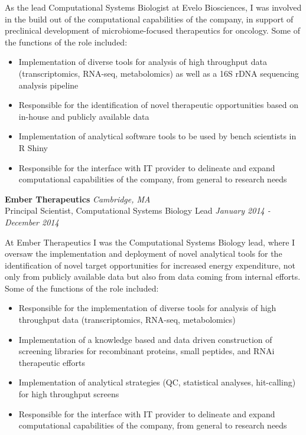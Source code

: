\documentclass[11pt, a4paper]{awesome-cv}
\providecommand{\tightlist}{%
	\setlength{\itemsep}{0pt}\setlength{\parskip}{0pt}}
\begin{document}
As the lead Computational Systems Biologist at Evelo Biosciences, I was
involved in the build out of the computational capabilities of the
company, in support of preclinical development of microbiome-focused
therapeutics for oncology. Some of the functions of the role included:

\begin{itemize}
\tightlist
\item
  Implementation of diverse tools for analysis of high throughput data
  (transcriptomics, RNA-seq, metabolomics) as well as a 16S rDNA
  sequencing analysis pipeline
\item
  Responsible for the identification of novel therapeutic opportunities
  based on in-house and publicly available data
\item
  Implementation of analytical software tools to be used by bench
  scientists in R Shiny
\item
  Responsible for the interface with IT provider to delineate and expand
  computational capabilities of the company, from general to research
  needs
\end{itemize}

\textbf{{Ember Therapeutics}} \hfill \emph{Cambridge, MA}\\
Principal Scientist, Computational Systems Biology Lead
\hfill \emph{January 2014 - December 2014}

At Ember Therapeutics I was the Computational Systems Biology lead,
where I oversaw the implementation and deployment of novel analytical
tools for the identification of novel target opportunities for increased
energy expenditure, not only from publicly available data but also from
data coming from internal efforts. Some of the functions of the role
included:

\begin{itemize}
\tightlist
\item
  Responsible for the implementation of diverse tools for analysis of
  high throughput data (transcriptomics, RNA-seq, metabolomics)
\item
  Implementation of a knowledge based and data driven construction of
  screening libraries for recombinant proteins, small peptides, and RNAi
  therapeutic efforts
\item
  Implementation of analytical strategies (QC, statistical analyses,
  hit-calling) for high throughput screens
\item
  Responsible for the interface with IT provider to delineate and expand
  computational capabilities of the company, from general to research
  needs
\end{itemize}
\end{document}
